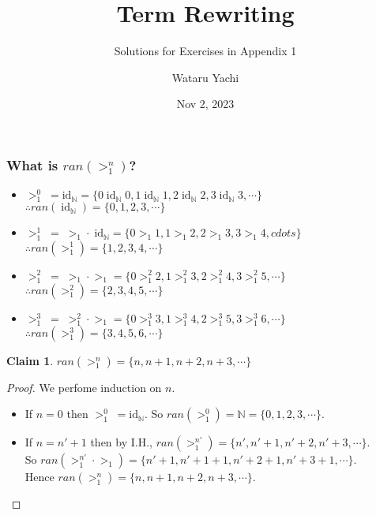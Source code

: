 \documentclass[12pt,aspectratio=169]{beamer}
\title{Term Rewriting}
\subtitle{Solutions for Exercises in Appendix 1}
\author{Wataru Yachi}
\institute{JAIST}
\date{Nov 2, 2023}
\theoremstyle{claim}
\newtheorem{claim}[theorem]{Claim}%
\begin{document}
\maketitle
\newcommand{\R}[3]{#1 \; #2 \; #3}
\newcommand{\sn}[1]{>_1^{#1}}

\begin{frame}
    \frametitle{What is $ran(\sn{n})$?}
    \begin{example}
        \newcommand{\idn}{\; \mathrm{id}_\mathbb{N} \;}
        \begin{itemize}
            \setlength{\itemsep}{+5mm}
            \pause
            \item $\sn{0}\; = \mathrm{id}_\mathbb{N} = \{0 \idn 0, 1 \idn 1, 2 \idn 2, 3 \idn 3, \cdots\}$
            \pause \quad $\therefore ran(\idn) = \{0,1,2,3,\cdots\}$
            \pause
            \item $\sn{1}\; = \; >_1 \cdot \;\mathrm{id}_\mathbb{N} = \{0 >_1 1, 1 >_1 2, 2 >_1 3, 3 >_1 4, cdots\}$
            \pause
            \quad $\therefore ran(\sn{1}) = \{1,2,3,4,\cdots\}$
            \pause
            \item $\sn{2}\; = \; >_1 \cdot >_1 = \{ 0 \sn{2} 2, 1 \sn{2} 3, 2 \sn{2} 4, 3 \sn{2} 5, \cdots \}$
            \pause \quad $\therefore ran(\sn{2}) = \{2, 3, 4, 5, \cdots \}$
            \pause
            \item $\sn{3}\; = \; \sn{2} \cdot >_1  = \{ 0 \sn{3} 3, 1 \sn{3} 4, 2 \sn{3} 5, 3 \sn{3} 6, \cdots \}$
            \pause
            $\therefore ran(\sn{3}) = \{3,4,5,6,\cdots\}$
        \end{itemize}
    \end{example}
\end{frame}

\begin{frame}
    \begin{claim}
        $ran(\sn{n}) = \{n, n+1, n+2, n+3, \cdots\}$
    \end{claim}
    \pause
    \begin{proof}
        \pause
        We perfome induction on $n$.
        \pause
        \begin{itemize}
            \pause
            \item If $n=0$ then $\sn{0} \; = \mathrm{id}_{\mathbb{N}}$.
            \pause
            So $ran(\sn{0}) = \mathbb{N} = \{0,1,2,3,\cdots \}$.
            \pause
            \item If $n=n'+1$ then by I.H., $ran(\sn{n'}) = \{n', n'+1, n'+2, n'+3, \cdots \}$.\\
                \pause
                    So $ran(\sn{n'} \cdot >_1) = \{n'+1, n'+1+1, n'+2+1, n'+3+1, \cdots \}$.\\
                    \pause
                    Hence $ran(\sn{n}) = \{n, n+1, n+2, n+3, \cdots\}$.
        \end{itemize}
    \end{proof}
\end{frame}
\end{document}
